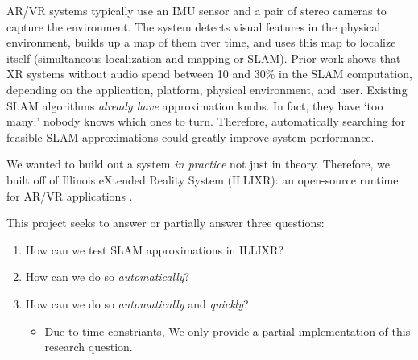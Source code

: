 AR/VR systems typically use an IMU sensor and a pair of stereo cameras to capture the environment. The system detects visual features in the physical environment, builds up a map of them over time, and uses this map to localize itself (\ul{simultaneous localization and mapping} or \ul{SLAM}). Prior work shows that XR systems without audio spend between 10 and 30\% in the SLAM computation, depending on the application, platform, physical environment, and user\cite{huzaifa2020exploring}. Existing SLAM algorithms \textit{already have} approximation knobs. In fact, they have `too many;' nobody knows which ones to turn. Therefore, automatically searching for feasible SLAM approximations could greatly improve system performance.


We wanted to build out a system \textit{in practice} not just in theory. Therefore, we built off of Illinois eXtended Reality System (ILLIXR): an open-source runtime for AR/VR applications . 

This project seeks to answer or partially answer three questions:

\begin{enumerate}[label={\textbf{R.Q. {\theenumi}}}]
\item How can we test SLAM approximations in ILLIXR?
\item How can we do so \textit{automatically}?
\item How can we do so \textit{automatically} and \textit{quickly}?
  \begin{itemize}
  \item Due to time constriants, We only provide a partial implementation of this research question.
  \end{itemize}
\end{enumerate}
